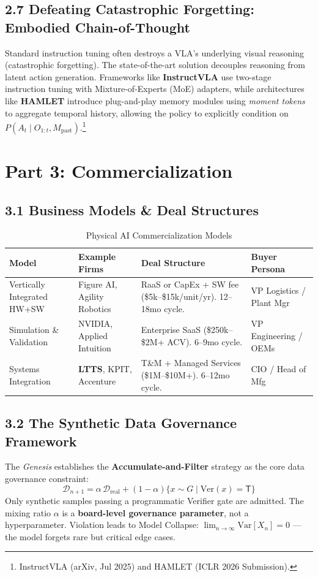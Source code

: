 \documentclass[11pt,a4paper]{article}
\begin{document}
\subsection{2.7 Defeating Catastrophic Forgetting: Embodied Chain-of-Thought}
Standard instruction tuning often destroys a VLA's underlying visual reasoning (catastrophic forgetting). The state-of-the-art solution decouples reasoning from latent action generation. Frameworks like \textbf{InstructVLA} use two-stage instruction tuning with Mixture-of-Experts (MoE) adapters, while architectures like \textbf{HAMLET} introduce plug-and-play memory modules using \textit{moment tokens} to aggregate temporal history, allowing the policy to explicitly condition on $P(A_t \mid O_{1:t}, M_{\text{past}})$.\footnote{InstructVLA (arXiv, Jul 2025) and HAMLET (ICLR 2026 Submission).}

\section{Part 3: Commercialization}

\subsection{3.1 Business Models \& Deal Structures}
\begin{table}[h!]
\centering
\small
\begin{tabularx}{\textwidth}{@{}l X X X@{}}
\toprule
\textbf{Model} & \textbf{Example Firms} & \textbf{Deal Structure} & \textbf{Buyer Persona} \\
\midrule
Vertically Integrated HW+SW & Figure AI, Agility Robotics & RaaS or CapEx + SW fee (\$5k--\$15k/unit/yr). 12--18mo cycle. & VP Logistics / Plant Mgr \\
Simulation \& Validation & NVIDIA, Applied Intuition & Enterprise SaaS (\$250k--\$2M+ ACV). 6--9mo cycle. & VP Engineering / OEMs \\
Systems Integration & \textbf{LTTS}, KPIT, Accenture & T\&M + Managed Services (\$1M--\$10M+). 6--12mo cycle. & CIO / Head of Mfg \\
\bottomrule
\end{tabularx}
\caption{Physical AI Commercialization Models}
\end{table}

\subsection{3.2 The Synthetic Data Governance Framework}
The \textit{Genesis} establishes the \textbf{Accumulate-and-Filter} strategy as the core data governance constraint:
\[
\mathcal{D}_{n+1} = \alpha\,\mathcal{D}_{\text{real}} + (1-\alpha)\{x \sim G \mid \text{Ver}(x) = \mathsf{T}\}
\]
Only synthetic samples passing a programmatic Verifier gate are admitted. The mixing ratio $\alpha$ is a \textbf{board-level governance parameter}, not a hyperparameter. Violation leads to Model Collapse: $\lim_{n \to \infty} \text{Var}[X_n] = 0$ --- the model forgets rare but critical edge cases.
\end{document}
